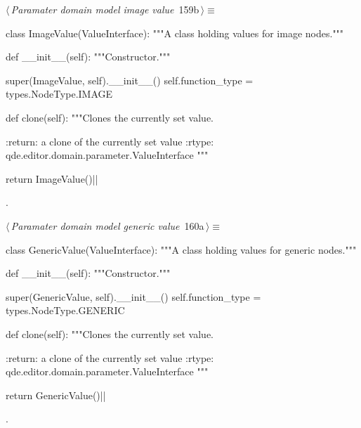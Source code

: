 \documentclass[%
    a4paper,    %
    justified,  %
    nobib,      %
    openany     %
]{tufte-book}
\begin{document}
\begin{flushleft} \small
\begin{minipage}{\linewidth}\label{scrap182}\raggedright\small
{} $\langle\,${\itshape Paramater domain model image value}\nobreak\ {\footnotesize {159b}}$\,\rangle\equiv$
\vspace{-1ex}
\begin{pythoncode}
class ImageValue(ValueInterface):
    """A class holding values for image nodes."""

    def __init__(self):
        """Constructor."""

        super(ImageValue, self).__init__()
        self.function_type = types.NodeType.IMAGE

    def clone(self):
        """Clones the currently set value.

        :return: a clone of the currently set value
        :rtype:  qde.editor.domain.parameter.ValueInterface
        """

        return ImageValue()|\NWsep|
\end{pythoncode}
\vspace{1.5ex}
\footnotesize
\begin{list}{}{\setlength{\itemsep}{-\parsep}\setlength{\itemindent}{-\leftmargin}}
\item {\NWtxtMacroNoRef}.

\item{}
\end{list}
\end{minipage}\vspace{4ex}
\end{flushleft}
\begin{flushleft} \small
\begin{minipage}{\linewidth}\label{scrap183}\raggedright\small
{} $\langle\,${\itshape Paramater domain model generic value}\nobreak\ {\footnotesize {160a}}$\,\rangle\equiv$
\vspace{-1ex}
\begin{pythoncode}
class GenericValue(ValueInterface):
    """A class holding values for generic nodes."""

    def __init__(self):
        """Constructor."""

        super(GenericValue, self).__init__()
        self.function_type = types.NodeType.GENERIC

    def clone(self):
        """Clones the currently set value.

        :return: a clone of the currently set value
        :rtype:  qde.editor.domain.parameter.ValueInterface
        """

        return GenericValue()|\NWsep|
\end{pythoncode}
\vspace{1.5ex}
\footnotesize
\begin{list}{}{\setlength{\itemsep}{-\parsep}\setlength{\itemindent}{-\leftmargin}}
\item {\NWtxtMacroNoRef}.

\item{}
\end{list}
\end{minipage}\vspace{4ex}
\end{flushleft}
\end{document}
